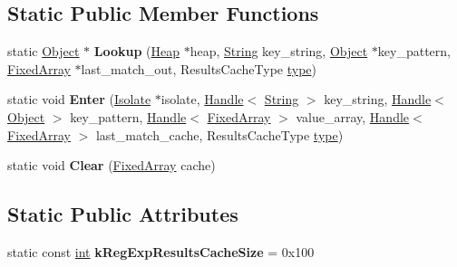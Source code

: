 \subsection*{Static Public Member Functions}
\begin{DoxyCompactItemize}
\item 
\mbox{\label{classv8_1_1internal_1_1RegExpResultsCache_a48098c516568b8283c25ec89f10bf2e1}} 
static \mbox{\hyperlink{classv8_1_1internal_1_1Object}{Object}} $\ast$ {\bfseries Lookup} (\mbox{\hyperlink{classv8_1_1internal_1_1Heap}{Heap}} $\ast$heap, \mbox{\hyperlink{classv8_1_1internal_1_1String}{String}} key\+\_\+string, \mbox{\hyperlink{classv8_1_1internal_1_1Object}{Object}} $\ast$key\+\_\+pattern, \mbox{\hyperlink{classv8_1_1internal_1_1FixedArray}{Fixed\+Array}} $\ast$last\+\_\+match\+\_\+out, Results\+Cache\+Type \mbox{\hyperlink{classstd_1_1conditional_1_1type}{type}})
\item 
\mbox{\label{classv8_1_1internal_1_1RegExpResultsCache_aeafd2342977a43afc254772a8bf8680a}} 
static void {\bfseries Enter} (\mbox{\hyperlink{classv8_1_1internal_1_1Isolate}{Isolate}} $\ast$isolate, \mbox{\hyperlink{classv8_1_1internal_1_1Handle}{Handle}}$<$ \mbox{\hyperlink{classv8_1_1internal_1_1String}{String}} $>$ key\+\_\+string, \mbox{\hyperlink{classv8_1_1internal_1_1Handle}{Handle}}$<$ \mbox{\hyperlink{classv8_1_1internal_1_1Object}{Object}} $>$ key\+\_\+pattern, \mbox{\hyperlink{classv8_1_1internal_1_1Handle}{Handle}}$<$ \mbox{\hyperlink{classv8_1_1internal_1_1FixedArray}{Fixed\+Array}} $>$ value\+\_\+array, \mbox{\hyperlink{classv8_1_1internal_1_1Handle}{Handle}}$<$ \mbox{\hyperlink{classv8_1_1internal_1_1FixedArray}{Fixed\+Array}} $>$ last\+\_\+match\+\_\+cache, Results\+Cache\+Type \mbox{\hyperlink{classstd_1_1conditional_1_1type}{type}})
\item 
\mbox{\label{classv8_1_1internal_1_1RegExpResultsCache_a188c3b3ad9c3c90c2820d7efe524083f}} 
static void {\bfseries Clear} (\mbox{\hyperlink{classv8_1_1internal_1_1FixedArray}{Fixed\+Array}} cache)
\end{DoxyCompactItemize}
\subsection*{Static Public Attributes}
\begin{DoxyCompactItemize}
\item 
\mbox{\label{classv8_1_1internal_1_1RegExpResultsCache_ad37862e92f47683bd89088d629b569c8}} 
static const \mbox{\hyperlink{classint}{int}} {\bfseries k\+Reg\+Exp\+Results\+Cache\+Size} = 0x100
\end{DoxyCompactItemize}


